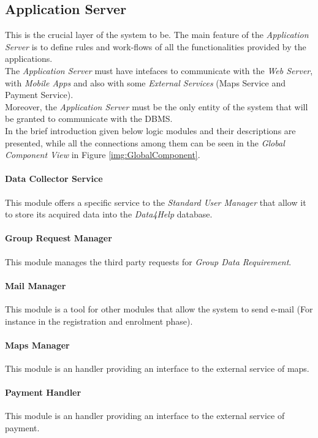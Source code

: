 \subsection{Application Server}
This is the crucial layer of the system to be. The main feature of the \textit{Application Server} is to define rules and work-flows of all the functionalities provided by the applications.\\
The \textit{Application Server} must have intefaces to communicate with the \textit{Web Server}, with \textit{Mobile Apps} and also with some \textit{External Services} (Maps Service and Payment Service).\\
Moreover, the \textit{Application Server} must be the only entity of the system that will be granted to communicate with the DBMS.\\
In the brief introduction given below logic modules and their descriptions are presented, while all the connections among them can be seen in the \textit{Global Component View} in Figure \ref{img:GlobalComponent}.

\paragraph{Data Collector Service}
This module offers a specific service to the \textit{Standard User Manager} that allow it to store its acquired data into the \textit{Data4Help} database.

\paragraph{Group Request Manager}
This module manages the third party requests for \textit{Group Data Requirement}.

\paragraph{Mail Manager}
This module is a tool for other modules that allow the system to send e-mail (For instance in the registration and enrolment phase).

\paragraph{Maps Manager}
This module is an handler providing an interface to the external service of maps.

\paragraph{Payment Handler}
This module is an handler providing an interface to the external service of payment.

